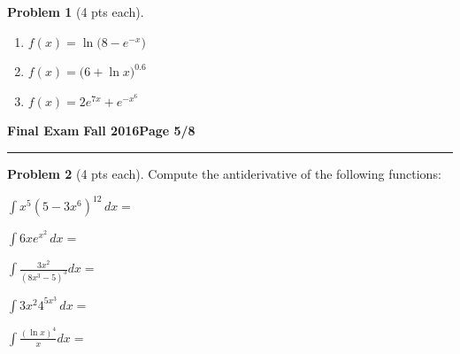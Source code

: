 \documentclass[12pt]{article}
\theoremstyle{definition}
\newtheorem{problem}{Problem}
\begin{document}
\begin{problem}[4 pts each]
\begin{enumerate}
\item $f(x) = \ln \big(8 - e^{-x}\big)$
\begin{flushright}
\end{flushright}
\item $f(x) = \big( 6 + \ln x \big)^{0.6}$
\begin{flushright}
\end{flushright}
\item $f(x) = 2e^{7x} + e^{-x^6}$
\begin{flushright}
\end{flushright}
\end{enumerate}
\end{problem}

\newpage

\hfill{\large\bf Final Exam}\hfill{\large\bf
  Fall 2016}\hfill{\large\bf Page 5/8}\hrule

\bigskip 

\begin{problem}[4 pts each]
Compute the antiderivative of the following functions:
\item $\displaystyle{\int x^5 (5 - 3x^6)^{12}\, dx =}$
\vspace{2cm}
\item $\displaystyle{\int  6xe^{x^2} \, dx =}$
\vspace{2cm}
\item $\displaystyle{\int \frac{3x^2}{(8x^3-5)^3} dx =}$
\vspace{4cm}
\item $\displaystyle{\int 3x^2 4^{5x^3}\, dx =}$
\vspace{4cm}
\item $\displaystyle{\int \frac{(\ln x)^4}{x} dx =}$
\vspace{4cm}
\end{problem}
\end{document}
